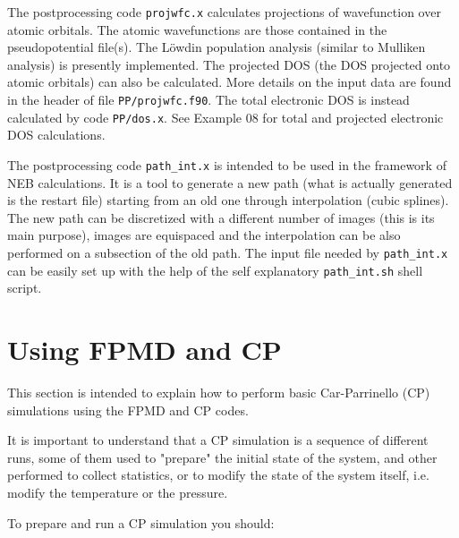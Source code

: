 \documentclass[12pt,a4paper]{article}
\begin{document}
The postprocessing code \texttt{projwfc.x} calculates projections of
wavefunction over atomic orbitals.
The atomic wavefunctions are those contained in the pseudopotential
file(s).
The L\"owdin population analysis (similar to Mulliken analysis) is
presently implemented.
The projected DOS (the DOS projected onto atomic orbitals) can also be
calculated.
More details on the input data are found in the header of file
\texttt{PP/projwfc.f90}.
The total electronic DOS is instead calculated by code
\texttt{PP/dos.x}.
See Example 08 for total and projected electronic DOS calculations.

The postprocessing code \texttt{path\_int.x} is intended to be used in
the framework of NEB calculations.
It is a tool to generate a new path (what is actually generated is the
restart file) starting from an old one through interpolation (cubic
splines).
The new path can be discretized with a different number of images
(this is its main purpose), images are equispaced and the
interpolation can be also performed on a subsection of the old path.
The input file needed by \texttt{path\_int.x} can be easily set up
with the help of the self explanatory \texttt{path\_int.sh} shell
script.

\clearpage

\section{Using FPMD and CP}

This section is intended to explain how to perform basic
Car-Parrinello (CP) simulations using the FPMD and CP codes.

It is important to understand that a CP simulation is a sequence of 
different runs, some of them used to "prepare" the initial state
of the system, and other performed to collect statistics,
or to modify the state of the system itself, i.e. modify the temperature
or the pressure.

To prepare and run a CP simulation you should:
\end{document}
